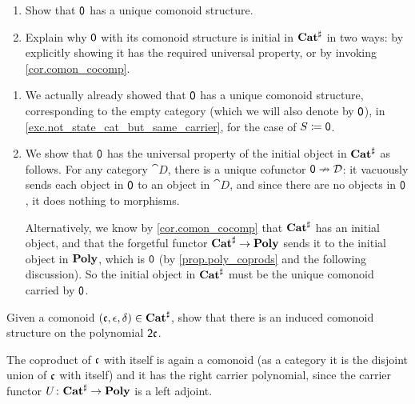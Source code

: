 \documentclass[Book-Poly]{subfiles}
\begin{document}
\begin{example}


\end{example}

\begin{exercise}\label{exc.0_initial_com}
\begin{enumerate}
	\item Show that $\textsf{0}$ has a unique comonoid structure.
	\item Explain why $\textsf{0}$ with its comonoid structure is initial in $\mathbf{Cat}^\sharp$ in two ways: by explicitly showing it has the required universal property, or by invoking \cref{cor.comon_cocomp}.
\qedhere
\end{enumerate}
\begin{solution}
\begin{enumerate}
    \item We actually already showed that $\textsf{0}$ has a unique comonoid structure, corresponding to the empty category (which we will also denote by $\textsf{0}$), in \cref{exc.not_state_cat_but_same_carrier}, for the case of $S\coloneqq\textsf{0}$.
    \item We show that $\textsf{0}$ has the universal property of the initial object in $\mathbf{Cat}^\sharp$ as follows.
    For any category $\cat{D}$, there is a unique cofunctor $\textsf{0}\nrightarrow\mathcal{D}$: it vacuously sends each object in $\textsf{0}$ to an object in $\cat{D}$, and since there are no objects in $\textsf{0}$, it does nothing to morphisms.

    Alternatively, we know by \cref{cor.comon_cocomp} that $\mathbf{Cat}^\sharp$ has an initial object, and that the forgetful functor $\mathbf{Cat}^\sharp\to\mathbf{Poly}$ sends it to the initial object in $\mathbf{Poly}$, which is $\textsf{0}$ (by \cref{prop.poly_coprods} and the following discussion).
    So the initial object in $\mathbf{Cat}^\sharp$ must be the unique comonoid carried by $\textsf{0}$.
\end{enumerate}
\end{solution}
\end{exercise}

\begin{exercise}
Given a comonoid $(\mathfrak{c},\epsilon,\delta)\in\mathbf{Cat}^\sharp$, show that there is an induced comonoid structure on the polynomial $\textsf{2}\mathfrak{c}$.
\begin{solution}
The coproduct of $\mathfrak{c}$ with itself is again a comonoid (as a category it is the disjoint union of $\mathfrak{c}$ with itself) and it has the right carrier polynomial, since the carrier functor $U\colon\mathbf{Cat}^\sharp\to\mathbf{Poly}$ is a left adjoint.
\end{solution}
\end{exercise}
\end{document}
